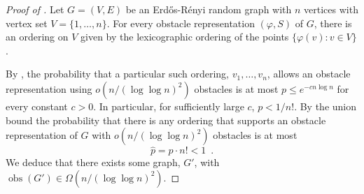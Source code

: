 \documentclass{patmorin}
\DeclareMathOperator{\obs}{obs}
\begin{document}
\begin{proof}[Proof of ]
  Let $G=(V,E)$ be an Erd\H{o}s-R\'enyi random graph with $n$ vertices
  with vertex set $V=\{1,\ldots,n\}$.  For every obstacle representation
  $(\varphi, S)$ of $G$, there is an ordering on $V$ given by the
  lexicographic ordering of the points $\{\varphi(v): v\in V\}$.

  By , the probability that a particular such ordering,
  $v_1,\ldots,v_n$, allows an obstacle representation using $o(n/(\log\log
  n)^2)$ obstacles is at most $p\le e^{-cn\log n}$ for every constant
  $c>0$. In particular, for sufficiently large $c$, $p < 1/n!$.  By the
  union bound the probability that there is any ordering that supports
  an obstacle representation of $G$ with $o(n/(\log\log n)^2)$ obstacles
  is at most
  \[
     \hat p = p\cdot n! < 1 \enspace .
  \]
  We deduce that there exists some graph, $G'$, with $\obs(G')\in
  \Omega(n/(\log\log n)^2)$.
\end{proof}
\end{document}
